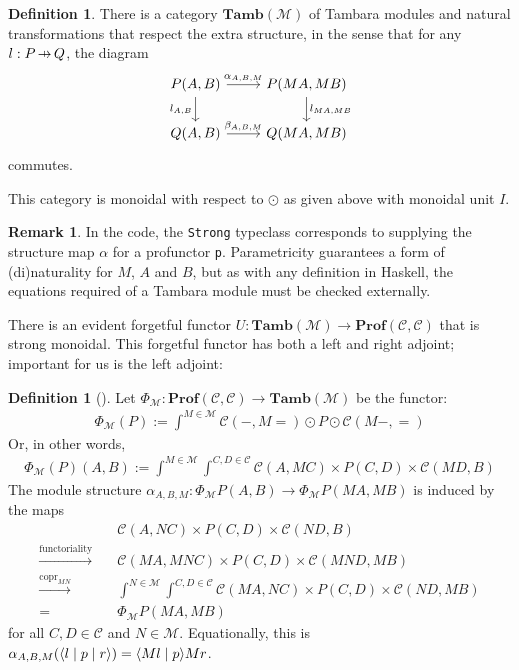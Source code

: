 \documentclass[11pt,a4paper]{article}
\theoremstyle{plain}
\theoremstyle{definition}
\newtheorem{definition}[theorem]{Definition}
\newtheorem{remark}[theorem]{Remark}
\newcommand{\C}{\mathscr{C}}
\newcommand{\M}{\mathscr{M}}
\newcommand{\Pastro}{\Phi}
\newcommand{\Prof}{\mathbf{Prof}}
\newcommand{\Tamb}{\mathbf{Tamb}}
\DeclareMathOperator{\copr}{copr}
\newcommand{\rep}[2]{{\ensuremath \left\langle #1 \mid #2 \right\rangle}}
\newcommand{\repthree}[3]{{\ensuremath \langle #1 \mid #2 \mid #3 \rangle}}
\newcommand{\hto}{\ensuremath{\,\mathaccent\shortmid\rightarrow\,}}
\begin{document}
\begin{definition}
  There is a category $\Tamb(\M)$ of Tambara modules and natural transformations that respect the extra structure, in the sense that for any $l : P \hto Q$, the diagram
  \[
    \begin{tikzcd}
      P(A,B) \ar[r, "\alpha_{A,B,M}"] \ar[d, "l_{A,B}" left] & P(MA, MB) \ar[d, "l_{MA, MB}" right] \\
      Q(A,B) \ar[r, "\beta_{A,B,M}"] & Q(MA, MB)
    \end{tikzcd}
  \]
  commutes.
\end{definition}

This category is monoidal with respect to $\odot$ as given above with monoidal unit $I$.

\begin{remark}
  In the code, the \texttt{Strong} typeclass corresponds to supplying the structure map $\alpha$ for a profunctor \texttt{p}. Parametricity guarantees a form of (di)naturality for $M$, $A$ and $B$, but as with any definition in Haskell, the equations required of a Tambara module must be checked externally.
\end{remark}

There is an evident forgetful functor $U : \Tamb(\M) \to \Prof(\C, \C)$ that is strong monoidal. This forgetful functor has both a left and right adjoint; important for us is the left adjoint:

\begin{definition}[{\cite[Section 5]{Doubles}}]
  Let $\Pastro_\M : \Prof(\C, \C) \to \Tamb(\M)$ be the functor:
  \begin{align*}
    \Pastro_\M(P) := \int^{M \in \M}  \C(-, M{=}) \odot P \odot \C(M-, {=})
  \end{align*}
  Or, in other words,
  \begin{align*}
    \Pastro_\M(P)(A,B) := \int^{M \in \M} \int^{C,D \in \C} \C(A, MC) \times P(C,D) \times  \C(MD, B)
  \end{align*}
  The module structure $\alpha_{A,B,M} : \Pastro_\M P(A,B) \to \Pastro_\M P (MA, MB)
  $ is induced by the maps
  \begin{align*}
    &\C(A, NC) \times P(C,D) \times  \C(ND, B) \\
    \xrightarrow{\text{functoriality}} \quad& \C(MA, MNC) \times P(C,D) \times  \C(MND, MB) \\
    \xrightarrow{\copr_{MN}} \quad&\int^{N \in \M} \int^{C,D \in \C} \C(MA, NC) \times P(C,D) \times  \C(ND, MB) \\
    = \quad&\Pastro_\M P (MA, MB)
  \end{align*}
  for all $C, D \in \C$ and $N \in \M$. Equationally, this is $\alpha_{A,B,M}(\repthree{l}{p}{r} ) = \rep{Ml}{p}{Mr} $.
\end{definition}
\end{document}
